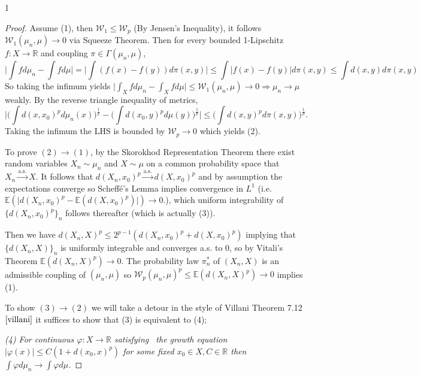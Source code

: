 \documentclass[12pt]{article}
\theoremstyle{definition}
\theoremstyle{plain}
\begin{document}
\begin{spacing}{1}
{\begin{proof}
    Assume (1), then $\mathcal{W}_1 \leq \mathcal{W}_p$ (By Jensen's Inequality), it follows $\mathcal{W}_1(\mu_n, \mu) \rightarrow 0$ via Squeeze Theorem. Then for every bounded 1-Lipschitz $f: X \rightarrow \mathbb{R}$ and coupling $\pi \in \Gamma(\mu_n, \mu)$,
    \[
    \bigg \lvert \displaystyle \int f d\mu_n - \int f d\mu \bigg \rvert = \bigg \lvert \int (f(x) - f(y)) d\pi(x, y) \bigg \rvert \leq \int \bigg \lvert f(x) - f(y) \bigg \rvert d\pi(x, y) \leq \int d(x, y) d\pi(x, y)
    \]
    So taking the infimum yields $\bigg \lvert \displaystyle \int_X f d\mu_n - \int_X f d\mu \bigg \rvert \leq \mathcal{W}_1(\mu_n, \mu) \rightarrow 0 \Rightarrow \mu_n \rightarrow \mu$ weakly. By the reverse triangle inequality of metrics,
    \[
    \bigg \lvert \bigg ( \displaystyle \int d(x, x_0)^p d\mu_n(x) \bigg )^\frac{1}{p} - \bigg ( \int d(x_0, y)^p d\mu(y) \bigg )^\frac{1}{p} \bigg \rvert \leq \bigg ( \int d(x, y)^pd\pi(x, y)\bigg )^\frac{1}{p}.
    \]
    Taking the infimum the LHS is bounded by $\mathcal{W}_p \rightarrow 0$ which yields (2).

    To prove $(2) \rightarrow (1)$, by the Skorokhod Representation Theorem there exist random variables $X_n \sim \mu_n$ and $X \sim \mu$ on a common probability space that $X_n \xrightarrow{\text{a.s.}} X$. It follows that $d(X_n, x_0)^p \xrightarrow{\text{a.s.}} d(X, x_0)^p$ and by assumption the expectations converge so Scheffé's Lemma implies convergence in $L^1$ (i.e. $\mathbb{E}( \lvert d(X_n, x_0)^p - \mathbb{E}(d(X, x_0)^p) \rvert) \rightarrow 0$.), which uniform integrability of $\{d(X_n, x_0)^p\}_n$ follows thereafter (which is actually (3)).
    
    \bigskip
    
    Then we have $d(X_n, X)^p \leq 2^{p - 1}(d(X_n, x_0)^p + d(X, x_0)^p)$ implying that $\{d(X_n, X)\}_n$ is uniformly integrable and converges a.s. to 0, so by Vitali's Theorem $\mathbb{E}(d(X_n, X)^p) \rightarrow 0$. The probability law $\pi_n^*$ of $(X_n, X)$ is an admissible coupling of $(\mu_n, \mu)$ so $\mathcal{W}_p(\mu_n, \mu)^p \leq \mathbb{E}(d(X_n, X)^p) \rightarrow 0$ implies (1). 
    
    \bigskip
    
    To show $(3) \rightarrow (2)$ we will take a detour in the style of Villani Theorem 7.12 $\cite{villani}$ it suffices to show that (3) is equivalent to (4);
    
    \bigskip
    
    {\itshape (4) For continuous $\varphi: X \rightarrow \mathbb{R}$ satisfying \ the growth equation $\lvert \varphi(x) \rvert \leq C(1 + d(x_0, x)^p)$ for
    some fixed $x_0 \in X, C \in \mathbb{R}$ then $\displaystyle \int \varphi d\mu_n \rightarrow \int \varphi d\mu$.}


\end{proof}}
\end{spacing}
\end{document}
